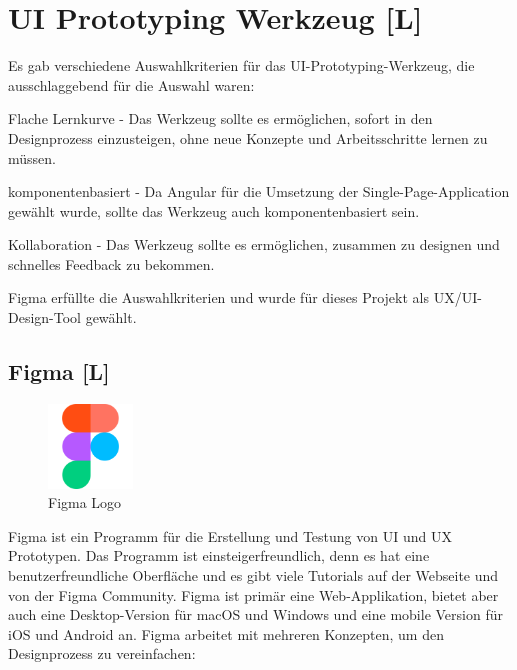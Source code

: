 \section{UI Prototyping Werkzeug [L]}
Es gab verschiedene Auswahlkriterien für das UI-Prototyping-Werkzeug, die ausschlaggebend für die Auswahl waren:
\begin{compactitem}
  \item Flache Lernkurve - Das Werkzeug sollte es ermöglichen, sofort in den Designprozess einzusteigen, ohne neue Konzepte und Arbeitsschritte lernen zu müssen.
  \item komponentenbasiert - Da Angular für die Umsetzung der Single-Page-Application gewählt wurde, sollte das Werkzeug auch komponentenbasiert sein.
  \item Kollaboration - Das Werkzeug sollte es ermöglichen, zusammen zu designen und schnelles Feedback zu bekommen.
\end{compactitem}

Figma erfüllte die Auswahlkriterien und wurde für dieses Projekt als UX/UI-Design-Tool gewählt.

\subsection{Figma [L]}
\label{ch::technologies::figma}

\begin{figure}
  \begin{center}
    \includegraphics[width=0.2\textwidth]{pics/figma_logo.png}
   \caption{Figma Logo}
  \end{center}
\end{figure}

Figma ist ein Programm für die Erstellung und Testung von UI und UX Prototypen. Das Programm ist einsteigerfreundlich, denn es hat eine benutzerfreundliche Oberfläche und es gibt viele Tutorials auf der Webseite und von der Figma Community. Figma ist primär eine Web-Applikation, bietet aber auch eine Desktop-Version für macOS und Windows und eine mobile Version für iOS und Android an. Figma arbeitet mit mehreren Konzepten, um den Designprozess zu vereinfachen:

